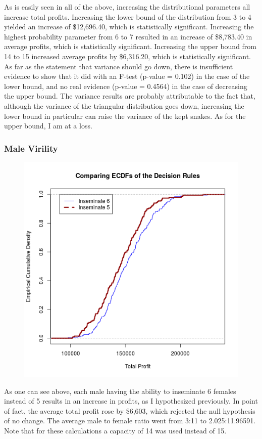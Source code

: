 \documentclass{article}
\begin{document}
		As is easily seen in all of the above, increasing the distributional parameters all increase total profits. Increasing the lower bound of the distribution from 3 to 4 yielded an increase of \$12,696.40, which is statistically significant. Increasing the highest probability parameter from 6 to 7 resulted in an increase of \$8,783.40 in average profits, which is statistically significant. Increasing the upper bound from 14 to 15 increased average profits by \$6,316.20, which is statistically significant. As far as the statement that variance should go down, there is insufficient evidence to show that it did  with an F-test (p-value = 0.102) in the case of the lower bound, and no real evidence (p-value = 0.4564) in the case of decreasing the upper bound. The variance results are probably attributable to the fact that, although the variance of the triangular distribution goes down, increasing the lower bound in particular can raise the variance of the kept snakes. As for the upper bound, I am at a loss.
		\subsubsection*{Male Virility}
		\begin{figure}[H]
		\centering
		\includegraphics[width=.5\textwidth]{virECDF.png}
		\end{figure}
		\indent\indent As one can see above, each male having the ability to inseminate 6 females instead of 5 results in an increase in profits, as I hypothesized previously. In point of fact, the average total profit rose by \$6,603, which rejected the null hypothesis of no change. The average male to female ratio went from 3:11 to 2.025:11.96591. Note that for these calculations a capacity of 14 was used instead of 15.
\end{document}
